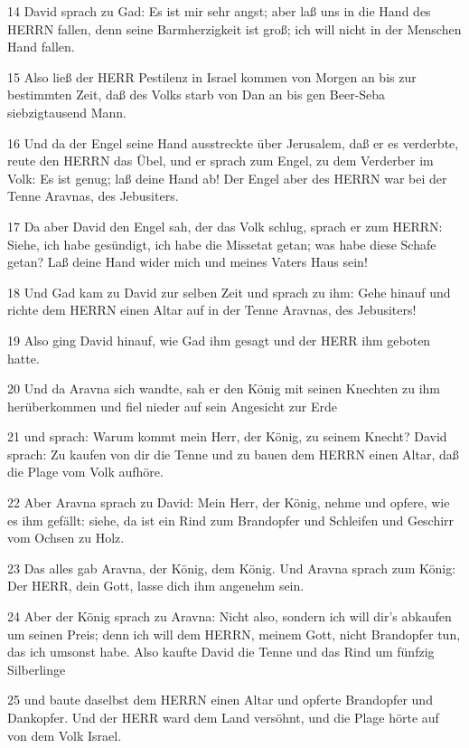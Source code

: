 \par 14 David sprach zu Gad: Es ist mir sehr angst; aber laß uns in die Hand des HERRN fallen, denn seine Barmherzigkeit ist groß; ich will nicht in der Menschen Hand fallen.
\par 15 Also ließ der HERR Pestilenz in Israel kommen von Morgen an bis zur bestimmten Zeit, daß des Volks starb von Dan an bis gen Beer-Seba siebzigtausend Mann.
\par 16 Und da der Engel seine Hand ausstreckte über Jerusalem, daß er es verderbte, reute den HERRN das Übel, und er sprach zum Engel, zu dem Verderber im Volk: Es ist genug; laß deine Hand ab! Der Engel aber des HERRN war bei der Tenne Aravnas, des Jebusiters.
\par 17 Da aber David den Engel sah, der das Volk schlug, sprach er zum HERRN: Siehe, ich habe gesündigt, ich habe die Missetat getan; was habe diese Schafe getan? Laß deine Hand wider mich und meines Vaters Haus sein!
\par 18 Und Gad kam zu David zur selben Zeit und sprach zu ihm: Gehe hinauf und richte dem HERRN einen Altar auf in der Tenne Aravnas, des Jebusiters!
\par 19 Also ging David hinauf, wie Gad ihm gesagt und der HERR ihm geboten hatte.
\par 20 Und da Aravna sich wandte, sah er den König mit seinen Knechten zu ihm herüberkommen und fiel nieder auf sein Angesicht zur Erde
\par 21 und sprach: Warum kommt mein Herr, der König, zu seinem Knecht? David sprach: Zu kaufen von dir die Tenne und zu bauen dem HERRN einen Altar, daß die Plage vom Volk aufhöre.
\par 22 Aber Aravna sprach zu David: Mein Herr, der König, nehme und opfere, wie es ihm gefällt: siehe, da ist ein Rind zum Brandopfer und Schleifen und Geschirr vom Ochsen zu Holz.
\par 23 Das alles gab Aravna, der König, dem König. Und Aravna sprach zum König: Der HERR, dein Gott, lasse dich ihm angenehm sein.
\par 24 Aber der König sprach zu Aravna: Nicht also, sondern ich will dir's abkaufen um seinen Preis; denn ich will dem HERRN, meinem Gott, nicht Brandopfer tun, das ich umsonst habe. Also kaufte David die Tenne und das Rind um fünfzig Silberlinge
\par 25 und baute daselbst dem HERRN einen Altar und opferte Brandopfer und Dankopfer. Und der HERR ward dem Land versöhnt, und die Plage hörte auf von dem Volk Israel.


